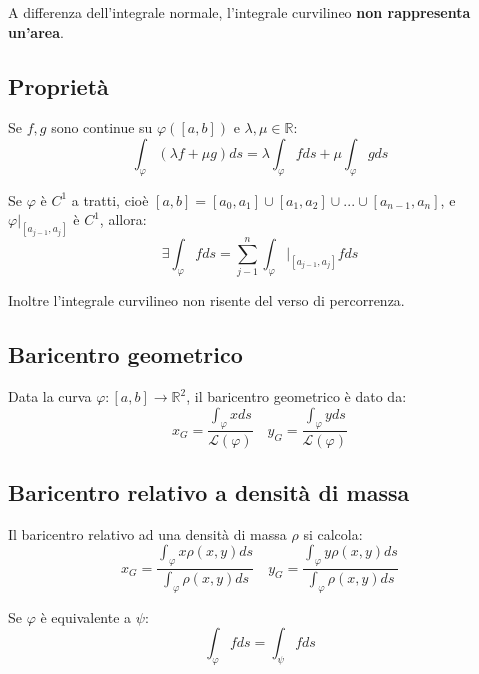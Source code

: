 \begin{observation}
A differenza dell'integrale normale, l'integrale curvilineo \textbf{non rappresenta un'area}.	
\end{observation}

\subsection{Proprietà}
Se $f, g$ sono continue su $\varphi([a, b])$ e $\lambda, \mu\in \mathbb{R}$:
\begin{equation}
	\int_\varphi (\lambda f+\mu g)ds=\lambda\int_\varphi f ds+\mu \int_\varphi g ds
\end{equation}

Se $\varphi$ è $C^1$ a tratti, cioè $[a, b]=[a_0, a_1]\cup [a_1, a_2]\cup...\cup [a_{n-1}, a_n]$, e $\varphi|_{[a_{j-1}, a_j]}$ è $C^1$, allora:
\begin{equation}
	\exists \int_\varphi f ds = \sum_{j-1}^n \int_\varphi|_{[a_{j-1}, a_j]} f ds
\end{equation}

Inoltre l'integrale curvilineo non risente del verso di percorrenza.

\subsection{Baricentro geometrico}
Data la curva $\varphi:[a, b]\rightarrow\mathbb{R}^2$, il baricentro geometrico è dato da:
\begin{equation}
	x_G=\frac{\int_\varphi x ds}{\mathcal{L}(\varphi)}\quad y_G=\frac{\int_\varphi y ds}{\mathcal{L}(\varphi)}
\end{equation}

\subsection{Baricentro relativo a densità di massa}
Il baricentro relativo ad una densità di massa $\rho$ si calcola:
\begin{equation}
	x_G=\frac{\int_\varphi x\rho(x, y)ds}{\int_\varphi \rho(x, y)ds} \quad y_G=\frac{\int_\varphi y\rho(x, y)ds}{\int_\varphi \rho(x, y)ds}
\end{equation}

Se $\varphi$ è equivalente a $\psi$:
\begin{equation}
	\int_\varphi fds=\int_\psi fds
\end{equation}

